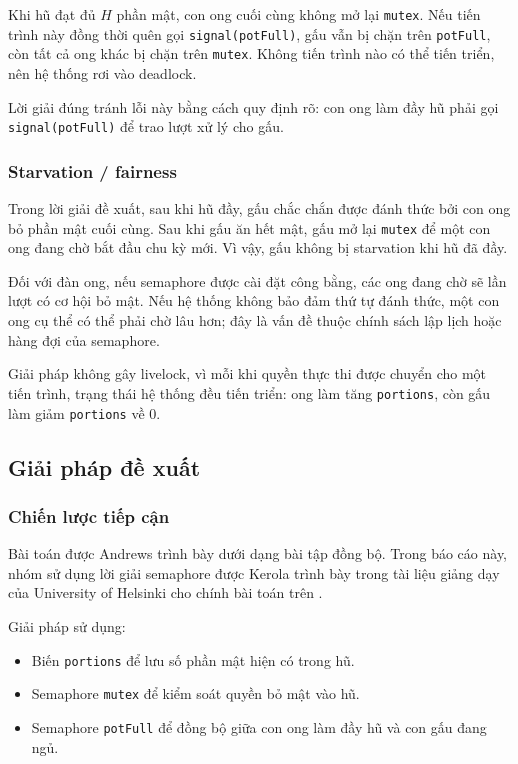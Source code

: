Khi hũ đạt đủ $H$ phần mật, con ong cuối cùng không mở lại
\texttt{mutex}. Nếu tiến trình này đồng thời quên gọi
\texttt{signal(potFull)}, gấu vẫn bị chặn trên \texttt{potFull}, còn tất
cả ong khác bị chặn trên \texttt{mutex}. Không tiến trình nào có thể
tiến triển, nên hệ thống rơi vào deadlock.

Lời giải đúng tránh lỗi này bằng cách quy định rõ: con ong làm đầy hũ
phải gọi \texttt{signal(potFull)} để trao lượt xử lý cho gấu.

\subsubsection*{Starvation / fairness}

Trong lời giải đề xuất, sau khi hũ đầy, gấu chắc chắn được đánh thức bởi
con ong bỏ phần mật cuối cùng. Sau khi gấu ăn hết mật, gấu mở lại
\texttt{mutex} để một con ong đang chờ bắt đầu chu kỳ mới. Vì vậy, gấu
không bị starvation khi hũ đã đầy.

Đối với đàn ong, nếu semaphore được cài đặt công bằng, các ong đang chờ
sẽ lần lượt có cơ hội bỏ mật. Nếu hệ thống không bảo đảm thứ tự đánh
thức, một con ong cụ thể có thể phải chờ lâu hơn; đây là vấn đề thuộc
chính sách lập lịch hoặc hàng đợi của semaphore.

Giải pháp không gây livelock, vì mỗi khi quyền thực thi được chuyển cho
một tiến trình, trạng thái hệ thống đều tiến triển: ong làm tăng
\texttt{portions}, còn gấu làm giảm \texttt{portions} về 0.


\subsection{Giải pháp đề xuất}

\subsubsection*{Chiến lược tiếp cận}

Bài toán được Andrews trình bày dưới dạng bài tập đồng bộ. Trong báo cáo này, nhóm sử dụng lời giải semaphore
được Kerola trình bày trong tài liệu giảng dạy của University of
Helsinki cho chính bài toán trên
\cite[Problem~4.36]{andrews2000}\cite[Slides~13--15]{kerola2012}.

Giải pháp sử dụng:

\begin{itemize}
\item Biến \texttt{portions} để lưu số phần mật hiện có trong hũ.
\item Semaphore \texttt{mutex} để kiểm soát quyền bỏ mật vào hũ.
\item Semaphore \texttt{potFull} để đồng bộ giữa con ong làm đầy hũ
và con gấu đang ngủ.
\end{itemize}

